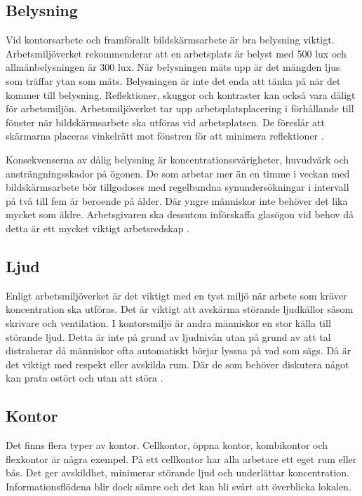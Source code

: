 \subsection{Belysning}
Vid kontorsarbete och framförallt bildskärmsarbete är bra belysning viktigt. Arbetsmiljöverket rekommenderar att en arbetsplats är belyst med 500 lux och allmänbelysningen är 300 lux. När belysningen mäts upp är det mängden ljus som träffar ytan som mäts. Belysningen är inte det enda att tänka på när det kommer till belysning. Reflektioner, skuggor och kontraster kan också vara dåligt för arbetsmiljön. Arbetsmiljöverket tar upp arbetsplatsplacering i förhållande till fönster när bildskärmsarbete ska utföras vid arbetsplatsen. De föreslår att skärmarna placeras vinkelrätt mot fönstren för att minimera reflektioner \cite{AVLjus}\cite{AVDator}.

Konsekvenserna av dålig belysning är koncentrationssvårigheter, huvudvärk och ansträngningsskador på ögonen. De som arbetar mer än en timme i veckan med bildskärmsarbete bör tillgodoses med regelbundna synundersökningar i intervall på två till fem år beroende på ålder. Där yngre människor inte behöver det lika mycket som äldre. Arbetsgivaren ska dessutom införskaffa glasögon vid behov då detta är ett mycket viktigt arbetsredskap \cite{AVLjus}.

\subsection{Ljud}
Enligt arbetsmiljöverket är det viktigt med en tyst miljö när arbete som kräver koncentration ska utföras. Det är viktigt att avskärma störande ljudkällor såsom skrivare och ventilation. I kontorsmiljö är andra människor en stor källa till störande ljud. Detta är inte på grund av ljudnivån utan på grund av att tal distraherar då människor ofta automatiskt börjar lyssna på vad som sägs. Då är det viktigt med respekt eller avskilda rum. Där de som behöver diskutera något kan prata ostört och utan att störa \cite{AVLjud}.

\subsection{Kontor}
Det finns flera typer av kontor. Cellkontor, öppna kontor, kombikontor och flexkontor är några exempel. På ett cellkontor har alla arbetare ett eget rum eller bås. Det ger avskildhet, minimerar störande ljud och underlättar koncentration. Informationsflödena blir dock sämre och det kan bli svårt att överblicka lokalen.

